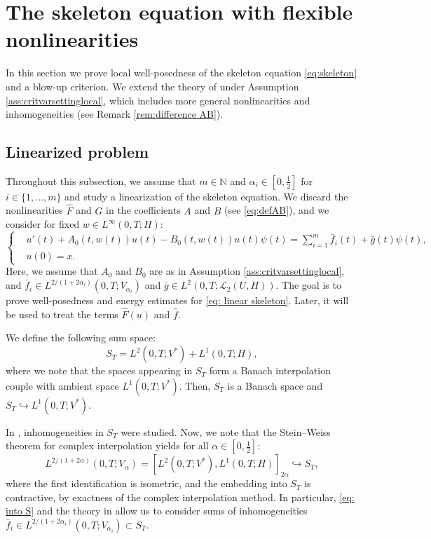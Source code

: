\documentclass{amsart}
\newcommand{\UH}{\mathscr{L}_2(U,H)}
\newcommand{\<}{\langle}
\newcommand{\?}{\rangle}
\newcommand{\into}{\hookrightarrow}
\theoremstyle{plain}
\theoremstyle{remark}
\theoremstyle{plain}
\numberwithin{equation}{section}
\def\N{{\mathbb N}}
\begin{document}
\section{The skeleton equation with flexible nonlinearities}

In this section we prove local well-posedness of the skeleton equation \eqref{eq:skeleton} and a blow-up criterion. We extend the theory of  \cite[\S3]{TV24} under Assumption \ref{ass:critvarsettinglocal}, which includes more general nonlinearities and inhomogeneities (see Remark \ref{rem:difference AB}). 

\subsection{Linearized problem}
Throughout this subsection, we assume that $m\in\N$ and  $\alpha_i\in[0,\frac12]$ for $i\in\{1,\ldots,m\}$ and study a  linearization of the skeleton equation. We discard the nonlinearities $\hat{F}$ and $G$ in the coefficients $A$ and $B$ (see \eqref{eq:defAB}), and we consider for fixed $w\in L^\infty(0,T;H)$:
\begin{equation}\label{eq: linear skeleton}
\begin{cases}
    &u'(t)+A_0(t,w(t))u(t)-B_0(t,w(t))u(t)\psi(t)=\sum_{i=1}^m\bar{f}_i(t)+\bar{g}(t)\psi(t), \\
    &u(0)=x.
\end{cases}
\end{equation}
Here, we assume that $A_0$ and $B_0$ are as in Assumption \ref{ass:critvarsettinglocal}, and $\bar{f}_{i}\in L^{2/(1+2\alpha_i)}(0,T;V_{\alpha_i})$ and $\bar{g}\in L^2(0,T;\UH)$.
The goal is to prove well-posedness and energy estimates for  \eqref{eq: linear skeleton}.   
Later, it will be used to treat the terms $\hat{F}(u)$ and $\hat{f}$.  

We define the following sum space:
\[
S_T=L^{2}(0,T;V^*)+L^{1}(0,T;H), 
\]
where we note that the spaces appearing in $S_T$ form a Banach interpolation couple with ambient space $L^1(0,T;V^*)$. Then, $S_T$ is a Banach space \cite[Prop.\ C.1.3]{HNVWvolume1} and $S_T\into L^1(0,T;V^*)$. 

In \cite[\S3.1]{TV24}, inhomogeneities in $S_T$ were studied. 
Now, we note that   the Stein--Weiss theorem for complex interpolation \cite[Th.\ 14.3.1]{HNVWvolume3} yields for all $\alpha\in[0,\frac12]$:
\begin{equation}\label{eq: into S}
  L^{2/(1+2\alpha)}(0,T;V_{\alpha})= [L^{2}(0,T;V^*),L^{1}(0,T;H)]_{2\alpha}\into S_T,  
\end{equation}
where the first identification is isometric, and  the embedding into $S_T$ is contractive, by exactness of the complex interpolation method.   
In particular, \eqref{eq: into S} and the theory in \cite[\S3.1]{TV24} allow us to consider sums of inhomogeneities $\bar{f}_i\in L^{2/(1+2\alpha_i)}(0,T;V_{\alpha_i})\subset S_T$. 
 
\end{document}
